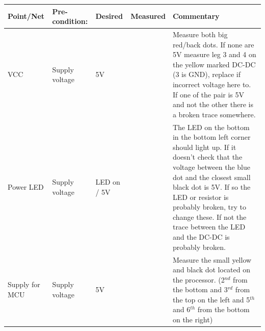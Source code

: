 \begin{table}[ht]
\begin{tabularx}{\textwidth}{|>{\hsize=0.6\hsize}X|>{\hsize=0.8\hsize}X|>{\hsize=0.8\hsize}X|c|>{\hsize=1.8\hsize}X|} %
\hline 
Point/Net & Pre-condition: & Desired & Measured & Commentary \\ 
\hline 
VCC & Supply voltage & 5V &   & Measure both big red/back dots. If none are 5V measure leg 3 and 4 on the yellow marked DC-DC (3 is GND), replace if incorrect voltage here to. If one of the pair is 5V and not the other there is a broken trace somewhere.\\ 
\hline 
Power LED & Supply voltage & LED on / 5V  &    & The LED on the bottom in the bottom left corner should light up. If it doesn’t check that the voltage between the blue dot and the closest small black dot is 5V. If so the LED or resistor is probably broken, try to change these. If not the trace between the LED and the DC-DC is probably broken. \\ 
\hline 
Supply for MCU & Supply voltage & 5V &   & Measure the small yellow and black dot located on the processor. (2$^{nd}$ from the bottom and 3$^{rd}$ from the top on the left and 5$^{th}$ and 6$^{th}$ from the bottom on the right) \\  
\hline
\end{tabularx}
\end{table}

\newpage

